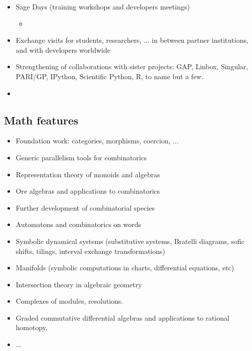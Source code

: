 \begin{itemize}
\item Sage Days (training workshops and developers meetings)
  \begin{itemize}
  \item {}
  \end{itemize}
\item Exchange visits for students, researchers, ... in between
  partner institutions, and with developers worldwide
\item Strengthening of collaborations with sister projects: GAP,
  Linbox, Singular, PARI/GP, IPython, Scientific Python, R, to name but a
  few.
\item {}
\end{itemize}



\subsection{Math features}

\begin{itemize}
\item Foundation work: categories, morphisms, coercion, ...
\item Generic parallelism tools for combinatorics
\item Representation theory of monoids and algebras
\item Ore algebras and applications to combinatorics
\item Further development of combinatorial species
\item Automatons and combinatorics on words
\item Symbolic dynamical systems (substitutive systems, Bratelli diagrams,
  sofic shifts, tilings, interval exchange transformations)
\item Manifolds (symbolic computations in charts, differential equations, etc)
\item Intersection theory in algebraic geometry
\item Complexes of modules, resolutions.
\item Graded commutative differential algebras and applications to rational homotopy.

\item ...
\end{itemize}


